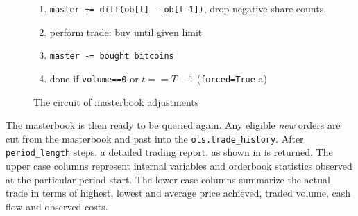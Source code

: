 \begin{figure}[ht]
	\centering
	\begin{enumerate}
	\item \lstinline!master += diff(ob[t] - ob[t-1])!, drop negative share counts.
	\item perform trade: buy until given limit
	\item \lstinline!master -= bought bitcoins!
	\item done if \lstinline!volume==0! or $t==T-1$ (\lstinline!forced=True! a)
	\end{enumerate}
	\caption{The circuit of masterbook adjustments}
	\label{fig:masterbookadjustments}
\end{figure}

The masterbook is then ready to be queried again. Any eligible \emph{new} orders are cut from the masterbook and past into the \lstinline!ots.trade_history!. After \lstinline!period_length! steps, a detailed trading report, as shown in  is returned. The upper case columns represent internal variables and orderbook statistics observed at the particular period start. The lower case columns summarize the actual trade in terms of highest, lowest and average price achieved, traded volume, cash flow and observed costs.\\

\begin{table}
\centering
{}
\caption{Trading history, as returned after four consecutive calls of \lstinline!ots.trade()!.}
\label{tab:tradinghistory}
\end{table}

